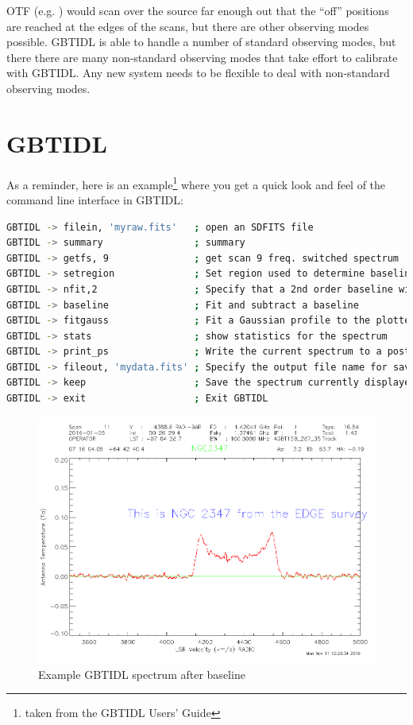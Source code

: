\documentclass[12pt,a4paper]{article}
\begin{document}
OTF (e.g. \cite{2007AA...474..679M})
would scan over the source far enough out that the ``off'' positions are reached at
the edges of the scans, but there are other observing modes possible. GBTIDL is able to
handle a number of standard observing modes, but there there are many non-standard
observing modes that take effort to calibrate with GBTIDL.  Any new system needs to
be flexible to deal with non-standard observing modes.

\section{GBTIDL}

As a reminder, here is an example\footnote{taken from the GBTIDL Users' Guide}
where you get a quick look and feel of the command line interface in GBTIDL:

\begin{lstlisting}[language=bash]
% gbtidl                         # Start GBTIDL from the unix prompt
GBTIDL -> filein, 'myraw.fits'   ; open an SDFITS file
GBTIDL -> summary                ; summary
GBTIDL -> getfs, 9               ; get scan 9 freq. switched spectrum
GBTIDL -> setregion              ; Set region used to determine baseline (interactive)
GBTIDL -> nfit,2                 ; Specify that a 2nd order baseline will be used
GBTIDL -> baseline               ; Fit and subtract a baseline
GBTIDL -> fitgauss               ; Fit a Gaussian profile to the plotted spectrum.
GBTIDL -> stats                  ; show statistics for the spectrum
GBTIDL -> print_ps               ; Write the current spectrum to a postscript file
GBTIDL -> fileout, 'mydata.fits' ; Specify the output file name for saved data
GBTIDL -> keep                   ; Save the spectrum currently displayed
GBTIDL -> exit                   ; Exit GBTIDL

\end{lstlisting}

\begin{figure}[h]
\centering
  \includegraphics[width=\textwidth]{gbtidl1.png}
\caption{\label{fig2} Example GBTIDL spectrum after baseline}
\end{figure}
\end{document}
